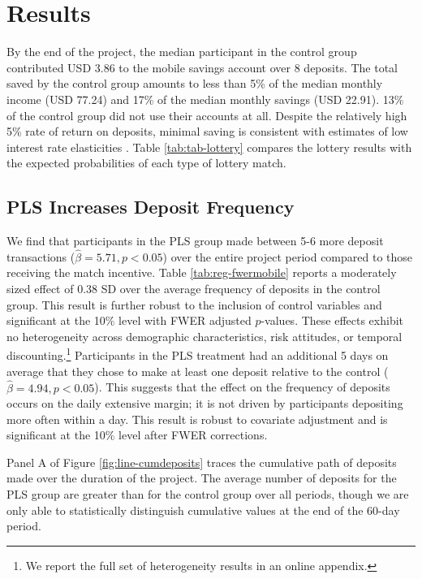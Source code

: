 \documentclass[11pt]{article}
\begin{document}
\section{Results} \label{sec:results}

	By the end of the project, the median participant in the control group contributed USD 3.86 to the mobile savings account over 8 deposits. The total saved by the control group amounts to less than 5\% of the median monthly income (USD 77.24) and 17\% of the median monthly savings (USD 22.91). 13\% of the control group did not use their accounts at all. Despite the relatively high 5\% rate of return on deposits, minimal saving is consistent with estimates of low interest rate elasticities \parencite{karlan_price_2018}. Table \ref{tab:tab-lottery} compares the lottery results with the expected probabilities of each type of lottery match.

	

	\subsection{PLS Increases Deposit Frequency}

		We find that participants in the PLS group made between 5-6 more deposit transactions ($\hat \beta = 5.71, p < 0.05$) over the entire project period compared to those receiving the match incentive. Table \ref{tab:reg-fwermobile} reports a moderately sized effect of 0.38 SD over the average frequency of deposits in the control group. This result is further robust to the inclusion of control variables and significant at the 10\% level with FWER adjusted $p$-values. These effects exhibit no heterogeneity across demographic characteristics, risk attitudes, or temporal discounting.\footnote{We report the full set of heterogeneity results in an online appendix.} Participants in the PLS treatment had an additional 5 days on average that they chose to make at least one deposit relative to the control ($\hat \beta = 4.94, p < 0.05$). This suggests that the effect on the frequency of deposits occurs on the daily extensive margin; it is not driven by participants depositing more often within a day. This result is robust to covariate adjustment and is significant at the 10\% level after FWER corrections.

		

		Panel A of Figure \ref{fig:line-cumdeposits} traces the cumulative path of deposits made over the duration of the project. The average number of deposits for the PLS group are greater than for the control group over all periods, though we are only able to statistically distinguish cumulative values at the end of the 60-day period.
\end{document}
